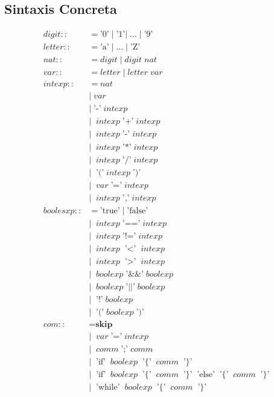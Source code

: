 \documentclass[11pt]{article}
\begin{document}

\subsection{Sintaxis Concreta}

\begin{align*}
  digit ::&= \text{'0'} \; | \; \text{'1'} | \; \dotsc \; | \; \text{'9'} \\
  letter ::&= \text{'a'} \; | \; \dotsc \; | \; \text{'Z'} \\
  nat ::&= digit \; | \; digit \; nat \\
  var ::&= letter \; | \; letter \; var \\
  intexp ::&= nat \\
           &| \; var \\
           &| \; \text{'-'} \; intexp \\
           &| \;\; intexp \; \text{'+'}  \; intexp \\
           &| \;\; intexp \; \text{'-'}  \; intexp \\
           &| \;\; intexp \; \text{'*'}  \; intexp \\
           &| \;\; intexp \; \text{'/'}  \; intexp \\
           &| \;\; \text{'('} \; intexp \; \text{')'} \\
           &| \;\; var \; \text{'='} \; intexp \\
           &| \;\; intexp \; \text{','} \; intexp \\
boolesxp ::&= \text{'true'} \; | \; \text{'false'} \\
           &| \;\; intexp \; \text{'=='} \; intexp \\
           &| \;\; intexp \; \text{'!='}  \; intexp \\
           &| \;\; intexp \; \text{'$<$'}  \; intexp \\
           &| \;\; intexp \; \text{'$>$'}  \; intexp \\
           &| \;\; boolexp \; \text{'\&\&'}  \; boolexp \\
           &| \;\; boolexp \; \text{'$\vert\vert$'}  \; boolexp \\
           &| \;\; \text{'!'} \; boolexp \\
           &| \;\; \text{'('} \; boolexp \; \text{')'} \\
com ::&= \textbf{skip} \\
      &| \;\; var \; \text{'='} \; intexp \\
      &| \;\; comm \; \text{';'} \; comm \\
      &| \;\; \text{'if'} \;\;boolexp \;\; \text{'\{'} \;\; comm \;\; \text{'\}'} \\
      &| \;\; \text{'if'} \;\;boolexp \;\; \text{'\{'} \;\; comm \;\; \text{'\}'}  \;\; \text{'else'} \;\; \text{'\{'} \;\; comm \;\; \text{'\}'} \\
      &| \;\; \text{'while'} \;\;boolexp \;\; \text{'\{'} \;\; comm \;\; \text{'\}'} \\
\end{align*}
\end{document}
